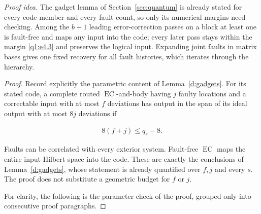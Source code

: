 \par\noindent\emph{Proof idea.} The gadget lemma of Section~\ref{sec:quantum} is already stated for every code member and every fault count, so only its numerical margins need checking. Among the \(b+1\) leading error-correction passes on a block at least one is fault-free and maps any input into the code; every later pass stays within the margin \eqref{q1:e4.3} and preserves the logical input. Expanding joint faults in matrix bases gives one fixed recovery for all fault histories, which iterates through the hierarchy.

\begin{proof}

Record explicitly the parametric content of Lemma~\ref{d:gadgets}. For its stated code, a complete routed \(\operatorname{EC}\)-and-body having \(j\) faulty locations and a correctable input with at most \(f\) deviations has output in the span of its ideal output with at most \(8j\) deviations if

\begin{equation}\label{q1:e4.2}
\begin{gathered}
8(f+j) \le  q_{s}-8.
\end{gathered}
\end{equation}

Faults can be correlated with every exterior system. Fault-free \(\operatorname{EC}\) maps the entire input Hilbert space into the code. These are exactly the conclusions of Lemma~\ref{d:gadgets}, whose statement is already quantified over \(f,j\) and every \(s\). The proof does not substitute a geometric budget for \(f\) or \(j\).

For clarity, the following is the parameter check of the proof, grouped only into consecutive proof paragraphs.


\end{proof}
